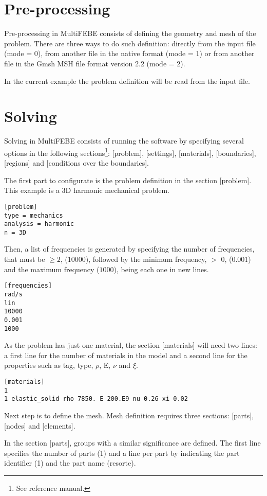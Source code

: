 \documentclass[a4]{article}
\begin{document}
\section{Pre-processing} 
Pre-processing in MultiFEBE consists of defining the geometry and mesh of the problem. There are three ways to do such definition: directly from the input file (mode = 0), from another file in the native format (mode = 1) or from another file in the Gmsh MSH file format version 2.2 (mode = 2).

In the current example the problem definition will be read from the input file.       

\section{Solving}
Solving in MultiFEBE consists of running the software by specifying several options in the following sections\footnote{See reference manual.}: [problem], [settings], [materials], [boundaries], [regions] and [conditions over the boundaries].

The first part to configurate is the problem definition in the section [problem]. This example is a 3D harmonic mechanical problem.  

\begin{Verbatim}	
[problem]
type = mechanics
analysis = harmonic
n = 3D
\end{Verbatim}

Then, a list of frequencies is generated by specifying the number of frequencies, that must be $\geq 2$, (10000), followed by the minimum frequency, $>$ 0, ($0.001$) and the maximum frequency ($1000$), being each one in new lines.

\begin{Verbatim}
[frequencies]
rad/s
lin
10000
0.001
1000
\end{Verbatim}

As the problem has just one material, the section [materials] will need two lines: a first line for the number of materials in the model and a second line for the properties such as tag, type, $\rho$, E, $\nu$ and $\xi$.

\begin{Verbatim}
[materials]
1
1 elastic_solid rho 7850. E 200.E9 nu 0.26 xi 0.02
\end{Verbatim}

Next step is to define the mesh. Mesh definition requires three sections: [parts], [nodes] and [elements]. 

In the section [parts], groups with a similar significance are defined. The first line specifies the number of parts (1) and a line per part by indicating the part identifier (1) and the part name (resorte).    
\end{document}
